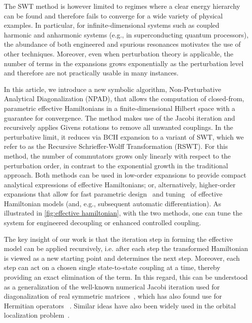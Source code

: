 \documentclass[%
 reprint,
 amsmath,amssymb,
 aps,
pra,
noeprint,
superscriptaddress,
]{revtex4-2}
\begin{document}
The SWT method is however limited to regimes where a clear energy hierarchy can be found and therefore fails to converge for a wide variety of physical examples. In particular, for infinite-dimensional systems such as coupled harmonic and anharmonic systems (e.g., in superconducting quantum processors), the abundance of both engineered and spurious resonances motivates the use of other techniques. Moreover, even when perturbation theory is applicable, the number of terms in the expansions grows exponentially as the perturbation level and therefore are not practically usable in many instances.

In this article, we introduce a new symbolic algorithm, Non-Perturbative Analytical Diagonalization (NPAD), that allows the computation of closed-from, parametric effective Hamiltonians in a finite-dimensional Hilbert space with a guarantee for convergence. The method makes use of the Jacobi iteration and recursively applies Givens rotations to remove all unwanted couplings. In the perturbative limit, it reduces via BCH expansion to a variant of SWT, which we refer to as the Recursive Schrieffer-Wolff Transformation (RSWT). For this method, the number of commutators grows only linearly with respect to the perturbation order, in contrast to the exponential growth in the traditional approach. Both methods can be used in low-order expansions to provide compact analytical expressions of effective Hamiltonians; or, alternatively, higher-order expansions that allow for fast parametric design~\cite{Goerz2017} and tuning~\cite{Menke2021} of effective Hamiltonian models (and, e.g., subsequent automatic differentiation). As illustrated in \cref{fig:effective hamiltonian}, with the two methods, one can tune the system for engineered decoupling or enhanced controlled coupling.

The key insight of our work is that the iteration step in forming the effective model can be applied recursively, i.e. after each step the transformed Hamiltonian is viewed as a new starting point and determines the next step. Moreover, each step can act on a chosen single state-to-state coupling at a time, thereby providing an exact elimination of the term. In this regard, this can be understood as a generalization of the well-known numerical Jacobi iteration used for diagonalization of real symmetric matrices~\cite{jacobi1846}, which has also found use for Hermitian operators ~\cite{Forsythe1960,henrici1958}.
Similar ideas have also been widely used in the orbital localization problem~\cite{Edmiston1963}.
\end{document}
